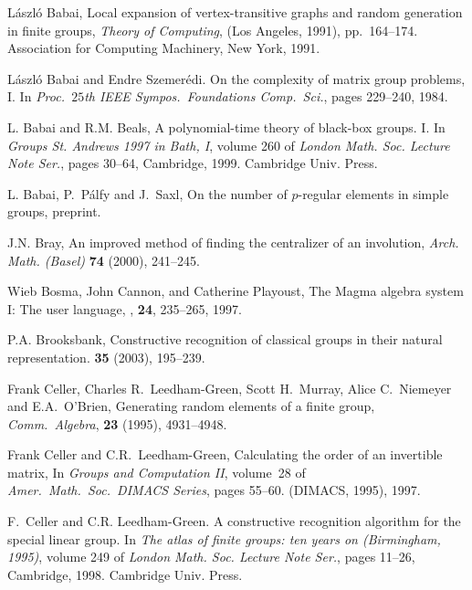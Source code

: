 \documentclass[12pt]{article}
\begin{document}
\begin{thebibliography}{10}

L\'aszl\'o Babai,  
Local expansion of vertex-transitive graphs and
  random generation in finite groups,  {\it Theory of Computing}, (Los
  Angeles, 1991), pp.\ 164--174. Association for Computing Machinery, 
New York, 1991.

L\'aszl\'o Babai and Endre Szemer\'edi.
\newblock On the complexity of matrix group problems, {I}.
\newblock In {\em Proc.\ $25$th IEEE Sympos.\ Foundations Comp.\ Sci.}, pages
  229--240, 1984.

L. Babai and R.M. Beals,
\newblock A polynomial-time theory of black-box groups. {I}.
\newblock In {\em Groups St. Andrews 1997 in Bath, I}, volume 260 of {\em
  London Math. Soc. Lecture Note Ser.}, pages 30--64, Cambridge, 1999.
  Cambridge Univ. Press.

 L. Babai, P.\ P{\'a}lfy and J.\ Saxl, On the number
of $p$-regular elements in simple groups, preprint.


 J.N. Bray, An improved method of finding
the centralizer of an involution, {\it Arch. Math. (Basel)}
{\bf 74} (2000), 241--245.

Wieb Bosma, John Cannon, and Catherine Playoust,
\newblock The {\sc Magma} algebra system I: The user language,
, {\bf 24}, 235--265, 1997.

P.A. Brooksbank,
\newblock Constructive recognition of classical groups
in their natural representation.
 {\bf 35} (2003), 195--239.

Frank Celler, Charles R.\ Leedham-Green, Scott H.\ Murray, Alice C.\
  Niemeyer and E.A.\ O'Brien, Generating random elements of a 
finite group, {\it Comm.\ Algebra}, {\bf 23} (1995), 4931--4948.

Frank Celler and C.R.\ Leedham-Green,
\newblock Calculating the order of an invertible matrix,
\newblock In {\em {Groups and Computation {II}}}, volume~28 of {\em Amer.\
  Math.\ Soc.\ DIMACS Series}, pages 55--60. (DIMACS, 1995), 1997.


F.~Celler and C.R. Leedham-Green.
\newblock A constructive recognition algorithm for the special linear group.
\newblock In {\em The atlas of finite groups: ten years on (Birmingham, 1995)},
  volume 249 of {\em London Math. Soc. Lecture Note Ser.}, pages 11--26,
  Cambridge, 1998. Cambridge Univ. Press.


\end{thebibliography}
\end{document}
